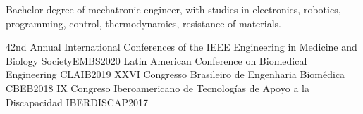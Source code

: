 \documentclass[
	a4paper,
]{fortysecondscv}
\begin{document}
\begin{cvtable}[1.5]
	{Bachelor degree of mechatronic engineer, with studies in electronics, robotics, programming, control, thermodynamics, resistance of materials.}
\end{cvtable}


\newpage
\makebacksidebar

\begin{cvtable}
    {42nd Annual International Conferences of the IEEE Engineering in Medicine and Biology Society}{EMBS}{2020}
	{Latin American Conference on Biomedical Engineering}
	{CLAIB}{2019}
	{XXVI Congresso Brasileiro de Engenharia Biomédica}
	{CBEB}{2018}
	{IX Congreso Iberoamericano de Tecnologías de Apoyo a la Discapacidad}
	{IBERDISCAP}{2017}
\end{cvtable}


\begin{cvtable}
\end{cvtable}

\cvsignature
\end{document}

